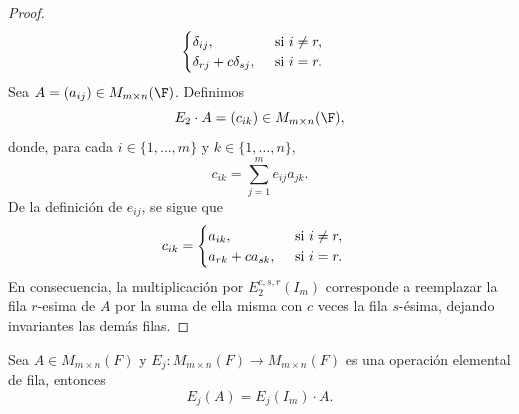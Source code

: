 \documentclass[12pt,a4paper]{book}
\begin{document}
\begin{proof}
\begin{equation*}
            \begin{cases}
                \delta_{ij},\hfill\text{ si }i\neq r,\\
                \delta_{rj}+c\delta_{sj},\quad\text{ si }i=r.
            \end{cases}
        \end{equation*}
        Sea $A=(a_{ij})\in M_{m\times n}(\F)$. Definimos
        \begin{equation*}
            E_{2}\cdot A=(c_{ik})\in M_{m\times n}(\F),
        \end{equation*}
        donde, para cada $i\in\{1,\dots,m\}$ y $k\in\{1,\dots,n\}$,
        \begin{equation*}
            c_{ik}=\sum_{j=1}^{m}e_{ij}a_{jk}.
        \end{equation*}
        De la definición de $e_{ij}$, se sigue que
        \begin{equation*}
            c_{ik}=
            \begin{cases}
                a_{ik},\hfill\text{ si }i\neq r,\\
                a_{rk}+ca_{sk},\quad\text{ si }i=r.
            \end{cases}
        \end{equation*}
        En consecuencia, la multiplicación por $E_{2}^{c,s,r}(I_{m})$ corresponde a reemplazar la fila $r$-esima de $A$ por la suma de ella misma con $c$ veces la fila $s$-ésima, dejando
        invariantes las demás filas.
    \end{proof}

    \vspace{1cm}

    \begin{proposicion}
        Sea $A\in M_{m\times n}(F)$ y $E_{j}:M_{m\times n}(F)\to M_{m\times n}(F)$ es
        una operación elemental de fila, entonces
        \begin{equation*}
            E_{j}(A)=E_{j}(I_{m})\cdot A.
        \end{equation*}
    \end{proposicion}
\end{document}
